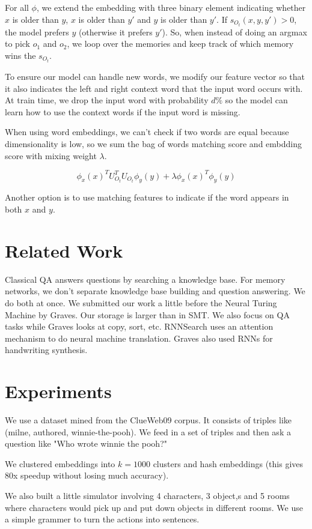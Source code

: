 \documentclass[a4paper]{article}
\begin{document}
For all $\phi$, we extend the embedding with three binary element indicating
whether $x$ is older than $y$, $x$ is older than $y'$ and $y$ is older than
$y'$. If $s_{O_t}(x, y, y') > 0$, the model prefers $y$ (otherwise it prefers
$y'$). So, when instead of doing an argmax to pick $o_1$ and $o_2$, we loop
over the memories and keep track of which memory wins the $s_{O_t}$.

To ensure our model can handle new words, we modify our feature vector so that
it also indicates the left and right context word that the input word occurs
with. At train time, we drop the input word with probability $d\%$ so the
model can learn how to use the context words if the input word is missing.

When using word embeddings, we can't check if two words are equal because
dimensionality is low, so we sum the bag of words matching score and embdding
score with mixing weight $\lambda$.

$$
\phi_x(x)^T U_{O_t}^T U_{O_t} \phi_y(y) + \lambda \phi_x(x)^T \phi_y(y)
$$

Another option is to use matching features to indicate if the word appears in
both $x$ and $y$.

\section{Related Work}
Classical QA answers questions by searching a knowledge base. For memory
networks, we don't separate knowledge base building and question answering.
We do both at once. We submitted our work a little before the Neural Turing
Machine by Graves. Our storage is larger than in SMT. We also focus on QA
tasks while Graves looks at copy, sort, etc. RNNSearch uses an attention
mechanism to do neural machine translation. Graves also used RNNs for
handwriting synthesis.

\section{Experiments}
We use a dataset mined from the ClueWeb09 corpus. It consists of triples
like (milne, authored, winnie-the-pooh). We feed in a set of triples
and then ask a question like "Who wrote winnie the pooh?"

We clustered embeddings into $k=1000$ clusters and hash embeddings (this gives
80x speedup without losing much accuracy).

We also built a little simulator involving 4 characters, 3 object,s and 5 rooms
where characters would pick up and put down objects in different rooms. We use
a simple grammer to turn the actions into sentences.
\end{document}
